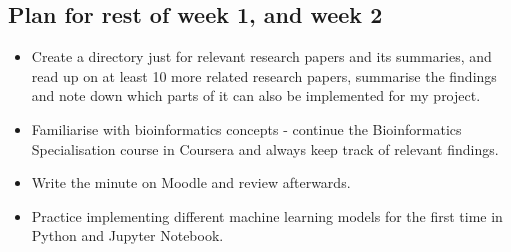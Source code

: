\documentclass[11pt]{article}
\begin{document}
\subsection{Plan for rest of week 1, and week 2}\label{plan}

\begin{itemize}
\item Create a directory just for relevant research papers and its summaries, and read up on at least 10 more related research papers, summarise the findings and note down which parts of it can also be implemented for my project.
\item Familiarise with bioinformatics concepts - continue the Bioinformatics Specialisation course in Coursera and always keep track of relevant findings.
\item Write the minute on Moodle and review afterwards.
\item Practice implementing different machine learning models for the first time in Python and Jupyter Notebook.
\end{itemize}
\end{document}
